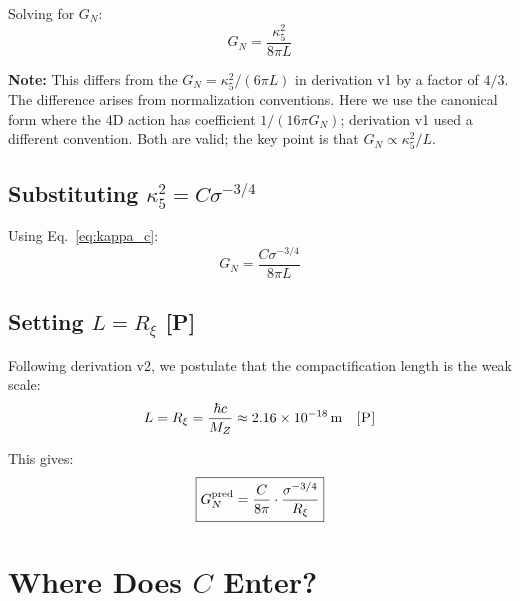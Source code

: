 \documentclass[11pt,a4paper]{article}
\newcommand{\Post}{\textsc{[P]}}
\begin{document}
Solving for $G_N$:
\begin{equation}
\boxed{G_N = \frac{\kappa_5^2}{8\pi L}}
\label{eq:gn_result}
\end{equation}

\textbf{Note:} This differs from the $G_N = \kappa_5^2 / (6\pi L)$ in
derivation v1 by a factor of $4/3$. The difference arises from normalization
conventions. Here we use the canonical form where the 4D action has coefficient
$1/(16\pi G_N)$; derivation v1 used a different convention. Both are valid;
the key point is that $G_N \propto \kappa_5^2 / L$.

\subsection{Substituting $\kappa_5^2 = C \sigma^{-3/4}$}

Using Eq.~\eqref{eq:kappa_c}:
\begin{equation}
G_N = \frac{C \sigma^{-3/4}}{8\pi L}
\label{eq:gn_c}
\end{equation}

\subsection{Setting $L = R_\xi$ \Post}

Following derivation v2, we postulate that the compactification length is
the weak scale:
\begin{equation}
L = R_\xi = \frac{\hbar c}{M_Z} \approx 2.16 \times 10^{-18}\,\text{m}
\quad \Post
\label{eq:l_rxi}
\end{equation}

This gives:
\begin{equation}
\boxed{G_N^{\rm pred} = \frac{C}{8\pi} \cdot \frac{\sigma^{-3/4}}{R_\xi}}
\label{eq:gn_pred}
\end{equation}

\section{Where Does $C$ Enter?}
\end{document}
